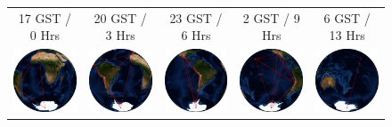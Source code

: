 \begin{figure}[h!]
	\vspace{-.1in}
	\begin{center}
		\begin{tabular}{ c  c  c  c  c  }
			\large{\textsf{17 GST / 0 Hrs}}  &   \large{\textsf{20 GST / 3 Hrs}}   &\large{\textsf{23 GST / 6 Hrs}} &\large{\textsf{2 GST / 9 Hrs}}  &\large{\textsf{6 GST / 13 Hrs}}    \\
			{{\includegraphics[width=.17\linewidth]{figures/uvcoverage/frames4/spin004.png}} }  & {{\includegraphics[width=.17\linewidth]{figures/uvcoverage/frames4/spin040.png}} } &
			{\includegraphics[width=.17\linewidth]{figures/uvcoverage/frames4/spin074.png}} %
			&
			{\includegraphics[width=.17\linewidth]{figures/uvcoverage/frames4/spin111.png}} &
			{\includegraphics[width=.17\linewidth]{figures/uvcoverage/frames4/spin159.png}} %
			

\end{tabular}
\end{center}
\end{figure}
